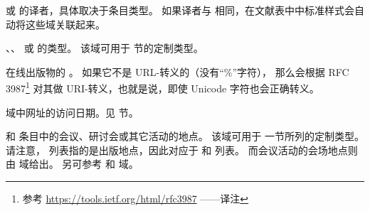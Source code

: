 \begin{fieldlist}

 或  的译者，具体取决于条目类型。
如果译者与  相同，在文献表中中标准样式会自动将这些域关联起来。




、、 或  的类型。
该域可用于  节的定制类型。




在线出版物的 。
如果它不是 URL-转义的（没有“\%”字符），
那么会根据 RFC 3987\footnote{参考 \url{https://tools.ietf.org/html/rfc3987} ——译注}
对其做 URI-转义，也就是说，即使 Unicode 字符也会正确转义。




 域中网址的访问日期。见  节。




 和  条目中的会议、研讨会或其它活动的地点。
该域可用于  一节所列的定制类型。
请注意， 列表指的是出版地点，因此对应于  和  列表。
而会议活动的会场地点则由  域给出。
另可参考  和  域。


\end{fieldlist}
